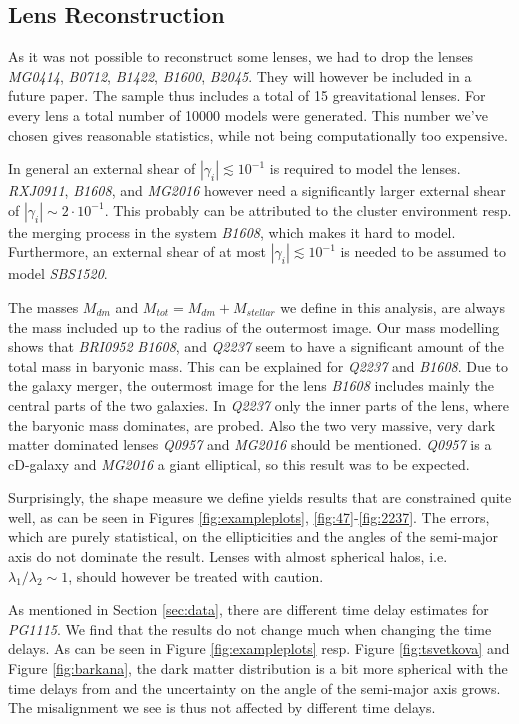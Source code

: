 \documentclass[10pt]{article}
\begin{document}
\subsection{Lens Reconstruction}
As it was not possible to reconstruct some lenses, we had to drop the lenses \textit{MG0414}, \textit{B0712}, \textit{B1422}, \textit{B1600}, \textit{B2045}. They will however be included in a future paper. The sample thus includes a total of 15 greavitational lenses. For every lens a total number of 10000 models were generated. This number we've chosen gives reasonable statistics, while not being computationally too expensive.

In general an external shear of $\left|\gamma_{i}\right|\lesssim10^{-1}$ is required to model the lenses. \textit{RXJ0911}, \textit{B1608}, and \textit{MG2016} however need a significantly larger external shear of $\left|\gamma_{i}\right|\sim2\cdot10^{-1}$. This probably can be attributed to the cluster environment resp. the merging process in the system \textit{B1608}, which makes it hard to model. Furthermore, an external shear of at most $\left|\gamma_{i}\right|\lesssim10^{-1}$ is needed to be assumed to model \textit{SBS1520}.

The masses $M_{dm}$ and $M_{tot}=M_{dm}+M_{stellar}$ we define in this analysis, are always the mass included up to the radius of the outermost image. Our mass modelling shows that \textit{BRI0952} \textit{B1608}, and \textit{Q2237} seem to have a significant amount of the total mass in baryonic mass. This can be explained for \textit{Q2237} and \textit{B1608}. Due to the galaxy merger, the outermost image for the lens \textit{B1608} includes mainly the central parts of the two galaxies. In \textit{Q2237} only the inner parts of the lens, where the baryonic mass dominates, are probed. Also the two very massive, very dark matter dominated lenses \textit{Q0957} and \textit{MG2016} should be mentioned. \textit{Q0957} is a cD-galaxy and \textit{MG2016} a giant elliptical, so this result was to be expected.

Surprisingly, the shape measure we define yields results that are constrained quite well, as can be seen in Figures \ref{fig:exampleplots}, \ref{fig:47}-\ref{fig:2237}. The errors, which are purely statistical, on the ellipticities and the angles of the semi-major axis do not dominate the result. Lenses with almost spherical halos, i.e. $\lambda_{1}/\lambda_{2}\sim1$, should however be treated with caution.

As mentioned in Section \ref{sec:data}, there are different time delay estimates for \textit{PG1115}. We find that the results do not change much when changing the time delays. As can be seen in Figure \ref{fig:exampleplots} resp. Figure \ref{fig:tsvetkova} and Figure \ref{fig:barkana}, the dark matter distribution is a bit more spherical with the time delays from \cite{2010MNRAS.406.2764T} and the uncertainty on the angle of the semi-major axis grows. The misalignment we see is thus not affected by different time delays.
\end{document}
